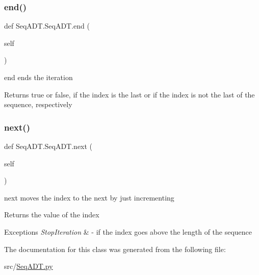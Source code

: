 \subsubsection{\texorpdfstring{end()}{end()}}
{\footnotesize\ttfamily def Seq\+A\+D\+T.\+Seq\+A\+D\+T.\+end (\begin{DoxyParamCaption}\item[{}]{self }\end{DoxyParamCaption})}



end ends the iteration 

\begin{DoxyReturn}{Returns}
true or false, if the index is the last or if the index is not the last of the sequence, respectively 
\end{DoxyReturn}
\mbox{\label{class_seq_a_d_t_1_1_seq_a_d_t_a1d2ee97ccd784507ae32c00150dc6fb0}} 
\subsubsection{\texorpdfstring{next()}{next()}}
{\footnotesize\ttfamily def Seq\+A\+D\+T.\+Seq\+A\+D\+T.\+next (\begin{DoxyParamCaption}\item[{}]{self }\end{DoxyParamCaption})}



next moves the index to the next by just incrementing 

\begin{DoxyReturn}{Returns}
the value of the index 
\end{DoxyReturn}

\begin{DoxyExceptions}{Exceptions}
{\em Stop\+Iteration} & -\/ if the index goes above the length of the sequence \\
\hline
\end{DoxyExceptions}


The documentation for this class was generated from the following file\+:\begin{DoxyCompactItemize}
\item 
src/\mbox{\hyperlink{_seq_a_d_t_8py}{Seq\+A\+D\+T.\+py}}\end{DoxyCompactItemize}
